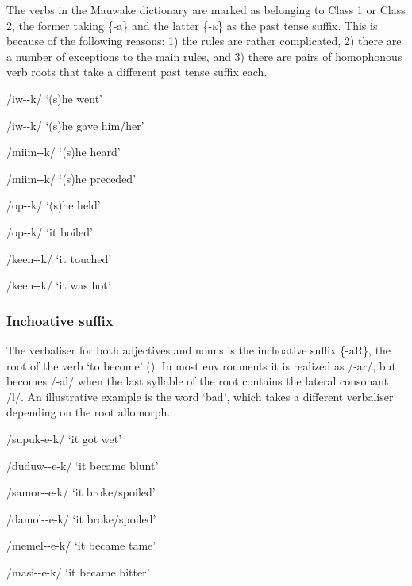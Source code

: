 The verbs in the Mauwake dictionary are marked as belonging to Class 1 or Class 2, the former taking \{-a\} and the latter \{-\textsc{e}\} as the past tense suffix. This is because of the following reasons: 1) the rules are rather complicated, 2) there are a number of exceptions to the main rules, and 3) there are pairs of homophonous verb roots that take a different past tense suffix each.

/iw--k/  `(s)he went'

/iw--k/  `(s)he gave him/her'

/miim--k/  `(s)he heard'

/miim--k/  `(s)he preceded'

/op--k/  `(s)he held'

/op--k/  `it boiled'

/keen--k/  `it touched'

/keen--k/  `it was hot'

\subsubsection{Inchoative suffix} 

The verbaliser for both adjectives and nouns is the inchoative suffix \{-aR\}, the root of the verb `to become' ().  In most environments it is realized as /\nobreakdash-ar/, but becomes /-al/ when the last syllable of the root contains the lateral consonant /l/.  An illustrative example is the word  `bad', which takes a different verbaliser depending on the root allomorph.

/supuk-e-k/  `it got wet'

/duduw--e-k/  `it became blunt'

/samor--e-k/  `it broke/spoiled'

/damol--e-k/  `it broke/spoiled'

/memel--e-k/  `it became tame'

/masi--e-k/  `it became bitter'


